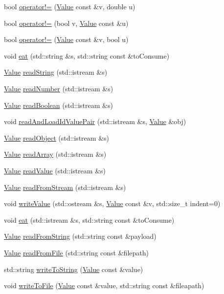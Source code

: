 \begin{DoxyCompactItemize}
bool \hyperlink{namespacej_adf29d27d61246107a9a785a898480464}{operator!=} (\hyperlink{classj_1_1_value}{Value} const \&v, double u)
\item 
bool \hyperlink{namespacej_a68303882cadf5e67fd2c12a37cb27b36}{operator!=} (bool v, \hyperlink{classj_1_1_value}{Value} const \&u)
\item 
bool \hyperlink{namespacej_a63d0627e8d899bbe43ce50977a69e1a0}{operator!=} (\hyperlink{classj_1_1_value}{Value} const \&v, bool u)
\item 
void \hyperlink{namespacej_ae2620d8a216fc7779246e7bcf01ff5a5}{eat} (std\-::string \&s, std\-::string const \&to\-Consume)
\item 
\hyperlink{classj_1_1_value}{Value} \hyperlink{namespacej_ae20167b8f5fdbef0e677bb9d949dd434}{read\-String} (std\-::istream \&s)
\item 
\hyperlink{classj_1_1_value}{Value} \hyperlink{namespacej_a1faf08a4cdc0181bf272d47e106d4f48}{read\-Number} (std\-::istream \&s)
\item 
\hyperlink{classj_1_1_value}{Value} \hyperlink{namespacej_a9df00b32f6a73cdb04765096a8482e54}{read\-Boolean} (std\-::istream \&s)
\item 
void \hyperlink{namespacej_ad98dfa91c238bad1c061ca49aa5e2424}{read\-And\-Load\-Id\-Value\-Pair} (std\-::istream \&s, \hyperlink{classj_1_1_value}{Value} \&obj)
\item 
\hyperlink{classj_1_1_value}{Value} \hyperlink{namespacej_a9231227d1e832b47cd0dfdadc53edd58}{read\-Object} (std\-::istream \&s)
\item 
\hyperlink{classj_1_1_value}{Value} \hyperlink{namespacej_a73f4f29c8eabde166bfc2e4eceb758f3}{read\-Array} (std\-::istream \&s)
\item 
\hyperlink{classj_1_1_value}{Value} \hyperlink{namespacej_a928421cbbec449be27c6ad6ffc31f014}{read\-Value} (std\-::istream \&s)
\item 
\hyperlink{classj_1_1_value}{Value} \hyperlink{namespacej_aeda072386716778360dd602c18fc7fe4}{read\-From\-Stream} (std\-::istream \&s)
\item 
void \hyperlink{namespacej_a4eb37b0713d7dcd198140d712d52a6eb}{write\-Value} (std\-::ostream \&s, \hyperlink{classj_1_1_value}{Value} const \&v, std\-::size\-\_\-t indent=0)
\item 
void \hyperlink{namespacej_a87018287cf81040f55ea35b72ec0f65b}{eat} (std\-::istream \&s, std\-::string const \&to\-Consume)
\item 
\hyperlink{classj_1_1_value}{Value} \hyperlink{namespacej_ade8697dc3d906c3dbfbfe64e4ca848eb}{read\-From\-String} (std\-::string const \&payload)
\item 
\hyperlink{classj_1_1_value}{Value} \hyperlink{namespacej_a5599dd4064dac2209bcc84b0d3a00b00}{read\-From\-File} (std\-::string const \&filepath)
\item 
std\-::string \hyperlink{namespacej_afe413a48c5e0d4a07756c408c6a0fae2}{write\-To\-String} (\hyperlink{classj_1_1_value}{Value} const \&value)
\item 
void \hyperlink{namespacej_a719c54fc105e49f1884c2d3ce19055dd}{write\-To\-File} (\hyperlink{classj_1_1_value}{Value} const \&value, std\-::string const \&fileapath)
\end{DoxyCompactItemize}


